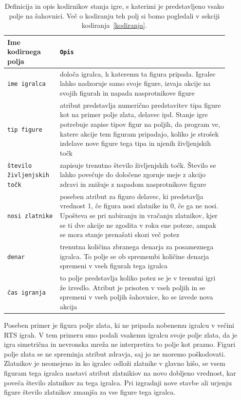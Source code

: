 \documentclass[a4paper, 12pt]{book}
\begin{document}
\begin{table}
	\begin{center}
		\begin{tabular}{p{0.2\linewidth}|p{0.7\linewidth}}
			Ime kodirnega polja                      & {\tt Opis} \\ \hline
			{\tt ime igralca}                        & določa igralca, h kateremu ta figura pripada. 
			 										Igralec lahko nadzoruje samo svoje figure, izvaja akcije na svojih figurah in napada nasprotnikove figure \\
			{\tt tip figure}                         & atribut predstavlja numerično predstavitev tipa figure kot na primer polje zlata, delavec ipd.
													Stanje igre potrebuje zapise tipov figur na poljih, da program ve, katere akcije tem figuram pripadajo, koliko je strošek izdelave nove figure tega tipa in njenih življenjskih točk\\
			{\tt število življenjskih točk}         & zapisuje trenutno število življenjskih točk.
													Število se lahko povečuje do določene zgornje meje z akcijo zdravi in znižuje z napadom nasprotnikove figure \\
			{\tt nosi zlatnike}                      & poseben atribut za figuro delavec, ki predstavlja vrednost 1, če figura nosi zlatnike in 0, če ga ne nosi.
													Upošteva se pri nabiranju in vračanju zlatnikov, kjer se ti dve akcije ne zgodita v roku ene poteze, ampak se mora stanje prenašati skozi več potez \\
			{\tt denar}                              & trenutna količina zbranega denarja za posameznega igralca.
													To polje se ob spremembi količine denarja spremeni v vseh figurah tega igralca \\
			{\tt čas igranja}                        & to polje predstavlja koliko potez se je v trenutni igri že izvedlo.
													Atribut je prisoten v vseh poljih in se spremeni v vseh poljih šahovnice, ko se izvede nova akcija \\
		\end{tabular}
	\end{center}
	\caption{Definicija in opis kodirnikov stanja igre, s katerimi je predstavljeno vsako polje na šahovnici. Več o kodiranju teh polj si bomo pogledali v sekciji kodiranja~\ref{kodiranja}.}
	\label{tableEncoders}
\end{table}

Poseben primer je figura polje zlata, ki ne pripada nobenemu igralcu v večini RTS igrah. 
V tem primeru smo podali vsakemu igralcu svoje polje zlata, da je igra simetrična in nevronska mreža ne interpretira to polje kot prazno.
Figuri polje zlata se ne spreminja atribut zdravja, saj jo ne moremo poškodovati. 
Zlatnikov je neomejeno in ko igralec odloži zlatnike v glavno hišo, se vsem figuram tega igralca nastavi atribut zlatnikiov na novo dobljeno vrednost, kar poveča število zlatnikov za tega igralca. 
Pri izgradnji nove stavbe ali urjenju figure število zlatnikov zmanjša za vse figure tega igralca.
\end{document}
